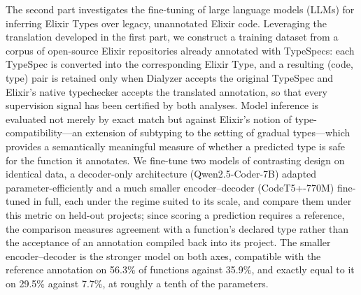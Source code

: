 The second part investigates the fine-tuning of large language models (LLMs) for inferring Elixir Types over legacy, unannotated Elixir code.
Leveraging the translation developed in the first part, we construct a training dataset from a corpus of open-source Elixir repositories already annotated with TypeSpecs: each TypeSpec is converted into the corresponding Elixir Type, and a resulting (code, type) pair is retained only when Dialyzer accepts the original TypeSpec and Elixir's native typechecker accepts the translated annotation, so that every supervision signal has been certified by both analyses.
Model inference is evaluated not merely by exact match but against Elixir's notion of type-compatibility---an extension of subtyping to the setting of gradual types---which provides a semantically meaningful measure of whether a predicted type is safe for the function it annotates.
We fine-tune two models of contrasting design on identical data, a decoder-only architecture (Qwen2.5-Coder-7B) adapted parameter-efficiently and a much smaller encoder--decoder (CodeT5+-770M) fine-tuned in full, each under the regime suited to its scale, and compare them under this metric on held-out projects; since scoring a prediction requires a reference, the comparison measures agreement with a function's declared type rather than the acceptance of an annotation compiled back into its project.
The smaller encoder--decoder is the stronger model on both axes, compatible with the reference annotation on 56.3\% of functions against 35.9\%, and exactly equal to it on 29.5\% against 7.7\%, at roughly a tenth of the parameters.